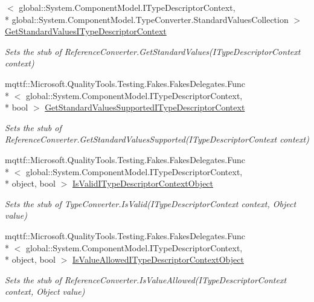 \begin{DoxyCompactItemize}
$<$ global\-::\-System.\-Component\-Model.\-I\-Type\-Descriptor\-Context, \\*
global\-::\-System.\-Component\-Model.\-Type\-Converter.\-Standard\-Values\-Collection $>$ \hyperlink{class_system_1_1_component_model_1_1_fakes_1_1_stub_reference_converter_a062fa49804762b63113b631e3c156d25}{Get\-Standard\-Values\-I\-Type\-Descriptor\-Context}
\begin{DoxyCompactList}\small\item\em Sets the stub of Reference\-Converter.\-Get\-Standard\-Values(\-I\-Type\-Descriptor\-Context context)\end{DoxyCompactList}\item 
mqttf\-::\-Microsoft.\-Quality\-Tools.\-Testing.\-Fakes.\-Fakes\-Delegates.\-Func\\*
$<$ global\-::\-System.\-Component\-Model.\-I\-Type\-Descriptor\-Context, \\*
bool $>$ \hyperlink{class_system_1_1_component_model_1_1_fakes_1_1_stub_reference_converter_ae0fb0760aa5454d8acd846795935d4ea}{Get\-Standard\-Values\-Supported\-I\-Type\-Descriptor\-Context}
\begin{DoxyCompactList}\small\item\em Sets the stub of Reference\-Converter.\-Get\-Standard\-Values\-Supported(\-I\-Type\-Descriptor\-Context context)\end{DoxyCompactList}\item 
mqttf\-::\-Microsoft.\-Quality\-Tools.\-Testing.\-Fakes.\-Fakes\-Delegates.\-Func\\*
$<$ global\-::\-System.\-Component\-Model.\-I\-Type\-Descriptor\-Context, \\*
object, bool $>$ \hyperlink{class_system_1_1_component_model_1_1_fakes_1_1_stub_reference_converter_afc6b0d51e67fd36968dd67ba43d66533}{Is\-Valid\-I\-Type\-Descriptor\-Context\-Object}
\begin{DoxyCompactList}\small\item\em Sets the stub of Type\-Converter.\-Is\-Valid(\-I\-Type\-Descriptor\-Context context, Object value)\end{DoxyCompactList}\item 
mqttf\-::\-Microsoft.\-Quality\-Tools.\-Testing.\-Fakes.\-Fakes\-Delegates.\-Func\\*
$<$ global\-::\-System.\-Component\-Model.\-I\-Type\-Descriptor\-Context, \\*
object, bool $>$ \hyperlink{class_system_1_1_component_model_1_1_fakes_1_1_stub_reference_converter_ae4679798bd27e2c5f28e887c62b4007c}{Is\-Value\-Allowed\-I\-Type\-Descriptor\-Context\-Object}
\begin{DoxyCompactList}\small\item\em Sets the stub of Reference\-Converter.\-Is\-Value\-Allowed(\-I\-Type\-Descriptor\-Context context, Object value)\end{DoxyCompactList}\end{DoxyCompactItemize}
